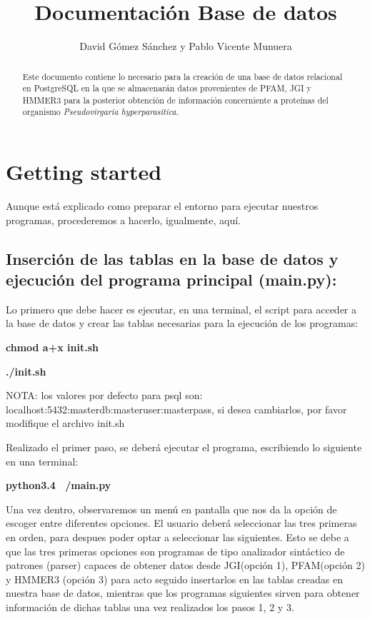\documentclass[11pt]{article} %
\title{Documentaci\'on Base de datos}
\author{David G\'omez S\'anchez y Pablo Vicente Munuera}
\date{} %
\begin{document}
	\maketitle
	
	\begin{abstract}
	
	Este documento contiene lo necesario para la creación de una base de datos relacional en PostgreSQL en la que se almacenarán datos provenientes de PFAM, JGI y HMMER3 para la posterior obtención de información concerniente a proteínas del organismo \emph{Pseudovirgaria hyperparasitica}.
	
	\end{abstract}
	
	\section{Getting started}
	
	Aunque est\'a explicado como preparar el entorno para ejecutar nuestros programas, procederemos a hacerlo, igualmente, aqu\'i.
	
	\subsection{Inserción de las tablas en la base de datos y ejecución del programa principal (main.py):}
	
	Lo primero que debe hacer es ejecutar, en una terminal, el script para acceder a la base de datos y crear las tablas necesarias para la ejecución de los programas:
	
	\textbf{chmod a+x init.sh}
	
	\textbf{./init.sh}
	
	NOTA: los valores por defecto para psql son: localhost:5432:masterdb:masteruser:masterpass, si desea cambiarlos, por favor modifique el archivo init.sh
	
	Realizado el primer paso, se deberá ejecutar el programa, escribiendo lo siguiente en una terminal:
	
	\textbf{python3.4 ~/main.py}
	
	Una vez dentro, observaremos un menú en pantalla que nos da la opción de escoger entre diferentes opciones. El usuario deberá seleccionar las tres primeras en orden, para despues poder optar a seleccionar las siguientes.
	Esto se debe a que las tres primeras opciones son programas de tipo analizador sintáctico de patrones (parser) capaces de obtener datos desde JGI(opción 1), PFAM(opción 2) y HMMER3 (opción 3) para acto seguido insertarlos en las tablas creadas en nuestra base de datos, mientras que los programas siguientes sirven para obtener información de dichas tablas una vez realizados los pasos 1, 2 y 3.
	
\end{document}
